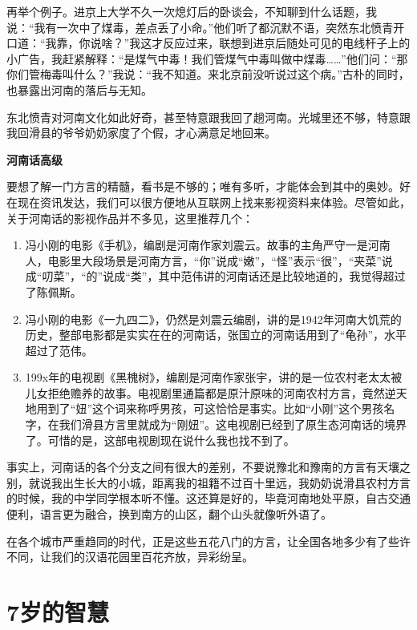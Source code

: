 \documentclass[twoside,openright,headings=optiontohead]{ctexbook} %
\providecommand{\tightlist}{%
   \setlength{\itemsep}{0pt}\setlength{\parskip}{0pt}}
\begin{document}
{再举个例子。进京上大学不久一次熄灯后的卧谈会，不知聊到什么话题，我说：``我有一次中了煤毒，差点丢了小命。''他们听了都沉默不语，突然东北愤青开口道：``我靠，你说啥？''我这才反应过来，联想到进京后随处可见的电线杆子上的小广告，我赶紧解释：``是煤气中毒！我们管煤气中毒叫做中煤毒\ldots{}\ldots{}''他们问：``那你们管梅毒叫什么？''我说：``我不知道。来北京前没听说过这个病。''古朴的同时，也暴露出河南的落后与无知。

东北愤青对河南文化如此好奇，甚至特意跟我回了趟河南。光城里还不够，特意跟我回滑县的爷爷奶奶家度了个假，才心满意足地回来。

\textbf{河南话高级}

要想了解一门方言的精髓，看书是不够的；唯有多听，才能体会到其中的奥妙。好在现在资讯发达，我们可以很方便地从互联网上找来影视资料来体验。尽管如此，关于河南话的影视作品并不多见，这里推荐几个：

\begin{enumerate}
\def\labelenumi{\arabic{enumi}.}
\tightlist
\item
  冯小刚的电影《手机》，编剧是河南作家刘震云。故事的主角严守一是河南人，电影里大段场景是河南方言，``你''说成``嫩''，``怪''表示``很''，``夹菜''说成``叨菜''，``的''说成``类''，其中范伟讲的河南话还是比较地道的，我觉得超过了陈佩斯。
\item
  冯小刚的电影《一九四二》，仍然是刘震云编剧，讲的是1942年河南大饥荒的历史，整部电影都是实实在在的河南话，张国立的河南话用到了``龟孙''，水平超过了范伟。
\item
  199x年的电视剧《黑槐树》，编剧是河南作家张宇，讲的是一位农村老太太被儿女拒绝赡养的故事。电视剧里通篇都是原汁原味的河南农村方言，竟然逆天地用到了``妞''这个词来称呼男孩，可这恰恰是事实。比如``小刚''这个男孩名字，在我们滑县方言里就成为``刚妞''。这电视剧已经到了原生态河南话的境界了。可惜的是，这部电视剧现在说什么我也找不到了。
\end{enumerate}

事实上，河南话的各个分支之间有很大的差别，不要说豫北和豫南的方言有天壤之别，就说我出生长大的小城，距离我的祖籍不过百十里远，我奶奶说滑县农村方言的时候，我的中学同学根本听不懂。这还算是好的，毕竟河南地处平原，自古交通便利，语言更为融合，换到南方的山区，翻个山头就像听外语了。

在各个城市严重趋同的时代，正是这些五花八门的方言，让全国各地多少有了些许不同，让我们的汉语花园里百花齐放，异彩纷呈。

\chapter*{7岁的智慧}\label{seven-years}

}
\end{document}
